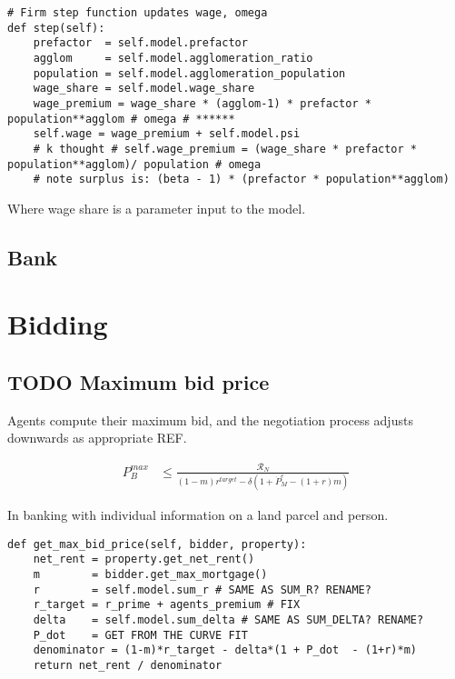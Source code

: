 \begin{lstlisting}
# Firm step function updates wage, omega
def step(self):
    prefactor  = self.model.prefactor
    agglom     = self.model.agglomeration_ratio
    population = self.model.agglomeration_population
    wage_share = self.model.wage_share  
    wage_premium = wage_share * (agglom-1) * prefactor * population**agglom # omega # ****** 
    self.wage = wage_premium + self.model.psi
    # k thought # self.wage_premium = (wage_share * prefactor * population**agglom)/ population # omega    
    # note surplus is: (beta - 1) * (prefactor * population**agglom)
\end{lstlisting}

Where wage share is a parameter input to the model.


\subsection{Bank}

\section{Bidding}


\subsection{TODO Maximum bid price}

Agents compute their maximum bid, and the negotiation process adjusts downwards as appropriate REF.

\begin{eqnarray}
P_B^{max} & \le    \frac{\mathcal{R}_N}{(1-m)r^{target}-\delta \left(1 + \dot P_M^e - (1+r)m\right)} \label{eqn-bid-price} \end{eqnarray}

In banking with individual information on a land parcel and person.
\begin{lstlisting}
def get_max_bid_price(self, bidder, property):
    net_rent = property.get_net_rent()
    m        = bidder.get_max_mortgage()
    r        = self.model.sum_r # SAME AS SUM_R? RENAME?
    r_target = r_prime + agents_premium # FIX
    delta    = self.model.sum_delta # SAME AS SUM_DELTA? RENAME?
    P_dot    = GET FROM THE CURVE FIT
    denominator = (1-m)*r_target - delta*(1 + P_dot  - (1+r)*m)
    return net_rent / denominator   
\end{lstlisting}

